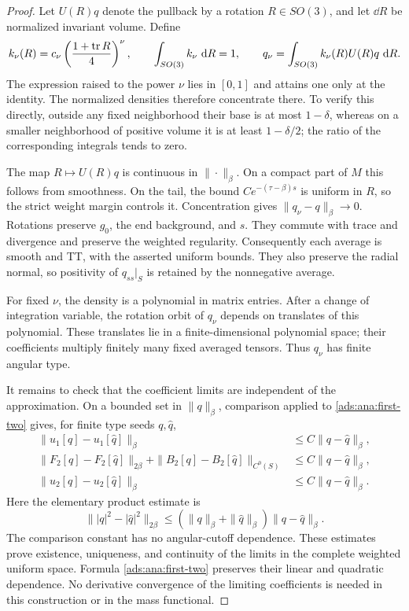 \begin{proof}
Let $U(R)q$ denote the pullback by a rotation $R\in SO(3)$, and
let $\dd R$ be normalized invariant volume.  Define
\[
 k_\nu(R)=c_\nu\left(\frac{1+\operatorname{tr} R}{4}\right)^\nu,
 \qquad \int_{SO(3)}k_\nu\,\,\mathrm d R=1,
 \qquad q_\nu=\int_{SO(3)}k_\nu(R)U(R)q\,\,\mathrm d R.
\]
The expression raised to the power $\nu$ lies in $[0,1]$ and attains
one only at the identity.  The normalized densities therefore
concentrate there.  To verify this directly, outside any fixed
neighborhood their base is at most $1-\delta$, whereas on a smaller
neighborhood of positive volume it is at least $1-\delta/2$;
the ratio of the corresponding integrals tends to zero.

The map $R\mapsto U(R)q$ is continuous in $\|\cdot\|_\beta$.
On a compact part of $M$ this follows from smoothness.  On the tail,
the bound $Ce^{-(\tau-\beta)s}$ is uniform in $R$, so the strict
weight margin controls it.  Concentration gives
$\|q_\nu-q\|_\beta\to0$.
Rotations preserve $g_0$, the end background, and $s$.  They commute
with trace and divergence and preserve the weighted regularity.
Consequently each average is smooth and TT, with the asserted uniform
bounds.  They also preserve the radial normal, so positivity of
$q_{ss}|_S$ is retained by the nonnegative average.

For fixed $\nu$, the density is a polynomial in matrix entries.
After a change of integration variable, the rotation orbit of $q_\nu$
depends on translates of this polynomial.  These translates lie in a
finite-dimensional polynomial space; their coefficients multiply
finitely many fixed averaged tensors.  Thus $q_\nu$ has finite angular
type.

It remains to check that the coefficient limits are independent of
the approximation.  On a bounded set in $\|q\|_\beta$, comparison
applied to \eqref{ads:ana:first-two} gives, for finite type seeds $q,\hat q$,
\begin{align*}
 \|u_1[q]-u_1[\hat q]\|_\beta
     &\leq C\|q-\hat q\|_\beta,\\
 \|F_2[q]-F_2[\hat q]\|_{2\beta}
  +\|B_2[q]-B_2[\hat q]\|_{C^0(S)}
     &\leq C\|q-\hat q\|_\beta,\\
 \|u_2[q]-u_2[\hat q]\|_\beta
     &\leq C\|q-\hat q\|_\beta.
\end{align*}
Here the elementary product estimate is
\[
 \bigl\||q|^2-|\hat q|^2\bigr\|_{2\beta}
 \leq(\|q\|_\beta+\|\hat q\|_\beta)\|q-\hat q\|_\beta.
\]
The comparison constant has no angular-cutoff dependence.
These estimates prove existence, uniqueness, and continuity of the
limits in the complete weighted uniform space.  Formula
\eqref{ads:ana:first-two} preserves their linear and quadratic dependence.
No derivative convergence of the limiting coefficients is needed in
this construction or in the mass functional.
\end{proof}

